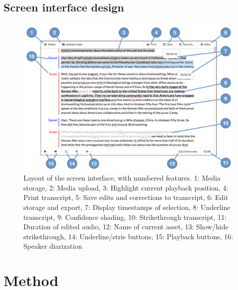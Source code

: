 
\subsection{Screen interface design}

\begin{figure}[ht]
  \centering
  \includegraphics[width=\columnwidth]{figs/discourse-interface-labelled.pdf}
  \caption{Layout of the screen interface, with numbered features.
  1: Media storage,
  2: Media upload,
  3: Highlight current playback position,
  4: Print transcript,
  5: Save edits and corrections to transcript,
  6: Edit storage and export,
  7: Display timestamps of selection,
  8: Underline transcript,
  9: Confidence shading,
  10: Strikethrough transcript,
  11: Duration of edited audio,
  12: Name of current asset,
  13: Show/hide strikethrough,
  14: Underline/strie buttons,
  15: Playback buttons,
  16: Speaker diarization}
  \label{fig:dialogger-interface}
\end{figure}

\section{Method}\label{sec:method}

